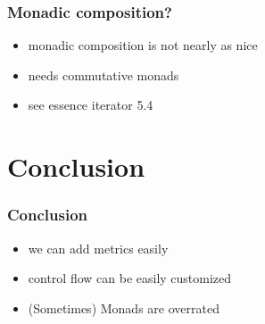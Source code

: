 \documentclass{beamer}
\begin{document}
\begin{frame}
  \frametitle{Monadic composition?}
  \begin{itemize}
  \item monadic composition is not nearly as nice
  \item needs commutative monads
  \item see essence iterator 5.4
  \end{itemize}
\end{frame}

\section{Conclusion}\label{sec:conclusion}

\begin{frame}
  \frametitle{Conclusion}
  \begin{itemize}
  \item we can add metrics easily
  \item control flow can be easily customized
  \item (Sometimes) Monads are overrated
  \end{itemize}
\end{frame}

\appendix{}
\end{document}
